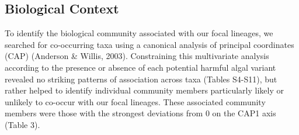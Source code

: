 \documentclass[
]{article}
\begin{document}
\normalsize

\hypertarget{biological-context}{%
\subsection{Biological Context}\label{biological-context}}

To identify the biological community associated with our focal lineages,
we searched for co-occurring taxa using a canonical analysis of
principal coordinates (CAP) (Anderson \& Willis, 2003). Constraining
this multivariate analysis according to the presence or absence of each
potential harmful algal variant revealed no striking patterns of
association across taxa (Tables S4-S11), but rather helped to identify
individual community members particularly likely or unlikely to co-occur
with our focal lineages. These associated community members were those
with the strongest deviations from 0 on the CAP1 axis (Table 3).

\small
\end{document}
